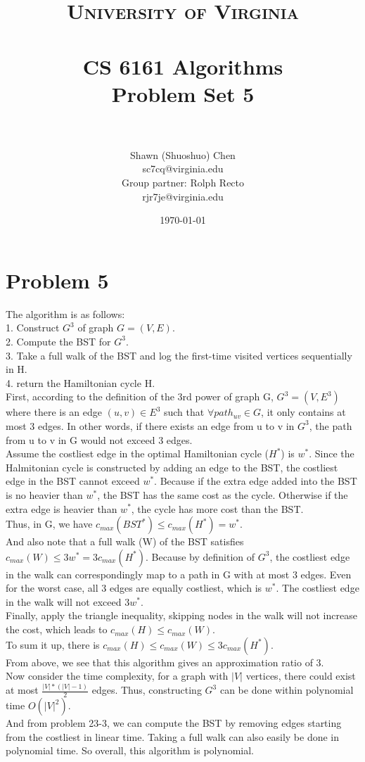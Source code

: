 \documentclass[titlepage, paper=a4, fontsize=11pt]{scrartcl} %
\title{	
\normalfont \normalsize 
\textsc{University of Virginia} \\ [25pt] %
\horrule{0.5pt} \\[0.4cm] %
\huge CS 6161 Algorithms \\
\huge Problem Set 5 \\ %
\horrule{2pt} \\[0.5cm] %
}
\author{Shawn (Shuoshuo) Chen\\sc7cq@virginia.edu\\Group partner: Rolph Recto\\ rjr7je@virginia.edu} %
\date{\normalsize\today} %
\numberwithin{equation}{section} %
\numberwithin{figure}{section} %
\numberwithin{table}{section} %
\begin{document}
\maketitle %


\section*{Problem 5}
The algorithm is as follows: \\
1. Construct $G^3$ of graph $G = (V, E)$. \\
2. Compute the BST for $G^3$. \\
3. Take a full walk of the BST and log the first-time visited vertices sequentially in H. \\
4. return the Hamiltonian cycle H. \\

First, according to the definition of the 3rd power of graph G, $G^3 = (V, E^3)$ where there is an edge
$(u, v) \in E^3$ such that $\forall path_{uv} \in G$, it only contains at most 3 edges. In other words, if there exists an edge from u to v in $G^3$, the path from u to v in G would not exceed 3 edges. \\
Assume the costliest edge in the optimal Hamiltonian cycle ($H^*$) is $w^*$. Since the Halmitonian cycle is constructed by adding an edge to the BST, the costliest edge in the BST cannot exceed $w^*$. Because if the extra edge added into the BST is no heavier than $w^*$, the BST has the same cost as the cycle. Otherwise if the extra edge is heavier than $w^*$, the cycle has more cost than the BST. \\
Thus, in G, we have $c_{max}(BST^*) \leq c_{max}(H^*) = w^*$. \\
And also note that a full walk (W) of the BST satisfies $c_{max}(W) \leq 3w^* = 3c_{max}(H^*)$. Because by definition of $G^3$, the costliest edge in the walk can correspondingly map to a path in G with at most 3 edges. Even for the worst case, all 3 edges are equally costliest, which is $w^*$. The costliest edge in the walk will not exceed $3w^*$. \\
Finally, apply the triangle inequality, skipping nodes in the walk will not increase the cost, which leads to
$c_{max}(H) \leq c_{max}(W)$. \\
To sum it up, there is $c_{max}(H) \leq c_{max}(W) \leq 3c_{max}(H^*)$. \\
From above, we see that this algorithm gives an approximation ratio of 3. \\

Now consider the time complexity, for a graph with $|V|$ vertices, there could exist at most $\frac{|V|*(|V|-1)}{2}$ edges. Thus, constructing $G^3$ can be done within polynomial time $O(|V|^2)$. \\
And from problem 23-3, we can compute the BST by removing edges starting from the costliest in linear time. Taking a full walk can also easily be done in polynomial time. So overall, this algorithm is polynomial.
\end{document}
